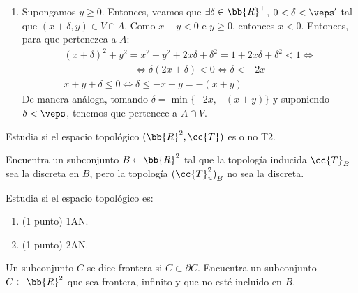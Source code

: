 \documentclass[12pt]{article}
\newcommand{\T}[0]{\cc{T}}
\begin{document}
\begin{ejercicio}
\begin{enumerate}
\begin{description}
\begin{enumerate}
                    \item Supongamos $y\geq 0$. Entonces, veamos que $\exists \delta \in \bb{R}^+$, $0<\delta<\veps'$ tal que $\left(x+\delta, y\right)\in V\cap A$.
                    Como $x+y<0$ e $y\geq 0$, entonces $x<0$. Entonces, para que pertenezca a $A$:
                    \begin{gather*}
                        \left(x+\delta\right)^2 + y^2  = x^2 + y^2 + 2x\delta + \delta^2 = 1 + 2x\delta + \delta^2 < 1 \Longleftrightarrow \\
                        \hspace{3cm}\Longleftrightarrow \delta(2x+\delta) < 0 \Longleftrightarrow \delta < -2x \\
                        x + y + \delta \leq 0 \Longleftrightarrow \delta \leq -x-y = -(x+y)
                    \end{gather*}
                    De manera análoga, tomando $\delta=\min\{-2x, -(x+y)\}$ y suponiendo $\delta<\veps$, tenemos que pertenece a $A\cap V$.
                \end{enumerate}
            \end{description}
        \end{enumerate}
    \end{ejercicio}

    \begin{ejercicio}[1 punto]
        Estudia si el espacio topológico $(\bb{R}^2,\T)$ es o no T2.
    \end{ejercicio}

    \begin{ejercicio}[1.5 puntos]
        Encuentra un subconjunto $B\subset \bb{R}^2$ tal que la topología inducida $\T_{B}$ sea la discreta en $B$, pero la topología ${(\T_u^2)}_B$ no sea la discreta.
    \end{ejercicio}

    \begin{ejercicio}
        Estudia si el espacio topológico es:
        \begin{enumerate}
            \item (1 punto) 1AN.
            \item (1 punto) 2AN.
        \end{enumerate}
    \end{ejercicio}

    \begin{ejercicio}[1.5 puntos]
        Un subconjunto $C$ se dice frontera si $C\subset \partial C$. Encuentra un subconjunto $C\subset \bb{R}^2$ que sea frontera, infinito y que no esté incluido en $B$.
    \end{ejercicio}
\end{document}
